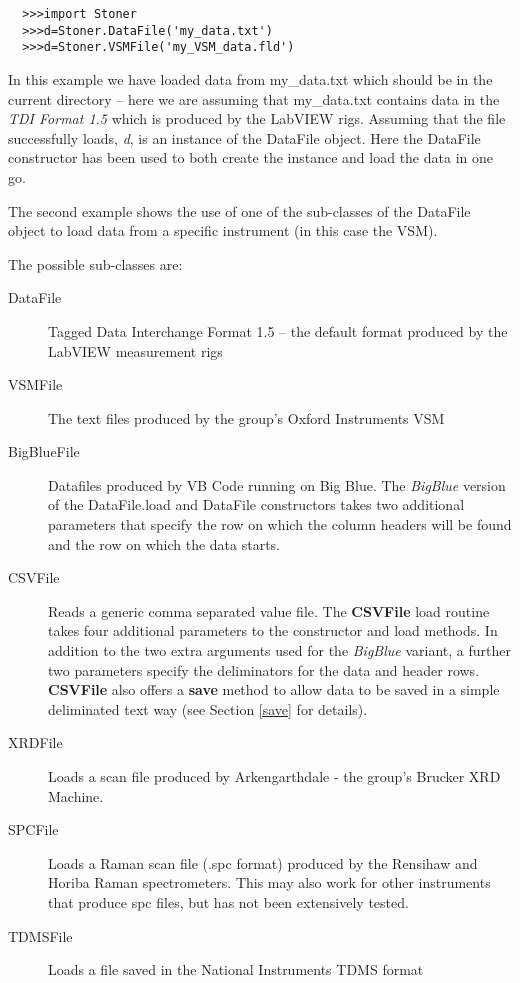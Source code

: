 \documentclass[a4paper,11pt]{scrartcl}
\begin{document}
\begin{verbatim}
  >>>import Stoner
  >>>d=Stoner.DataFile('my_data.txt')
  >>>d=Stoner.VSMFile('my_VSM_data.fld')
\end{verbatim}

In this example we have loaded data from my\_data.txt which should be in the
current directory -- here we are assuming that my\_data.txt contains data in the
\textit{TDI Format 1.5} which is produced by the LabVIEW rigs. Assuming that the
file successfully loads, \textit{d}, is an instance of the DataFile object. Here
the DataFile constructor has been used to both create the instance and load the
data in one go.

The second example shows the use of one of the sub-classes of the DataFile object to load data from a specific instrument (in this case the VSM).


The possible sub-classes are:
\begin{description}
\item[DataFile] Tagged Data Interchange Format 1.5 -- the default format produced by
the LabVIEW measurement rigs
\item[VSMFile] The text files produced by the group's Oxford Instruments VSM
\item[BigBlueFile] Datafiles produced by VB Code running on Big Blue. The
\textit{BigBlue} version of the DataFile.load and DataFile constructors takes
two additional parameters that specify the row on which the column headers will
be found and the row on which the data starts.
\item[CSVFile] Reads a generic comma separated value file. The \textbf{CSVFile} load
routine takes four additional parameters to the constructor and load methods. In
addition to the two extra arguments used for the \textit{BigBlue} variant, a
further two parameters specify the deliminators for the data and header rows. \textbf{CSVFile} also offers a \textbf{save} method to allow data to be saved in a simple deliminated text way (see Section \ref{save} for details).
\item[XRDFile] Loads a scan file produced by Arkengarthdale - the group's Brucker
XRD Machine.
\item[SPCFile] Loads a Raman scan file (.spc format) produced by the Rensihaw and Horiba
Raman spectrometers. This may also work for other instruments that produce spc files, but has not been extensively tested.
\item[TDMSFile] Loads a file saved in the National Instruments TDMS format

\end{description}
\end{document}
